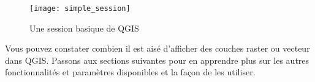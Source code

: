 

\begin{figure}[ht]    \begin{center}    \caption{Une session basique de QGIS \nixcaption}\label{fig:simple_session}\smallskip    \texttt{[image: simple\_session]} \end{center}   \end{figure}

Vous pouvez constater combien il est ais\'e d'afficher des couches raster ou vecteur dans QGIS. Passons aux sections suivantes pour en apprendre plus sur les autres fonctionnalit\'es et param\`etres disponibles et la fa\c{c}on de les utiliser.
